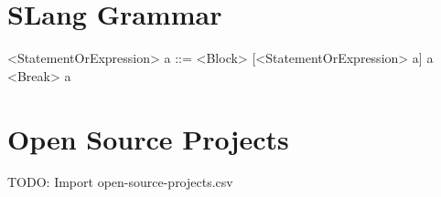 \section{SLang Grammar}
\label{app:slang grammar}

\setlength{\grammarparsep}{20pt plus 1pt minus 1pt} %
\setlength{\grammarindent}{12em} %
\begin{grammar}
	<StatementOrExpression> a ::=	<Block> [<StatementOrExpression> a] a
	\alt  <Break> a
\end{grammar}



\pagebreak



\section{Open Source Projects}
\label{app:open_source_projects}

TODO: Import open-source-projects.csv
